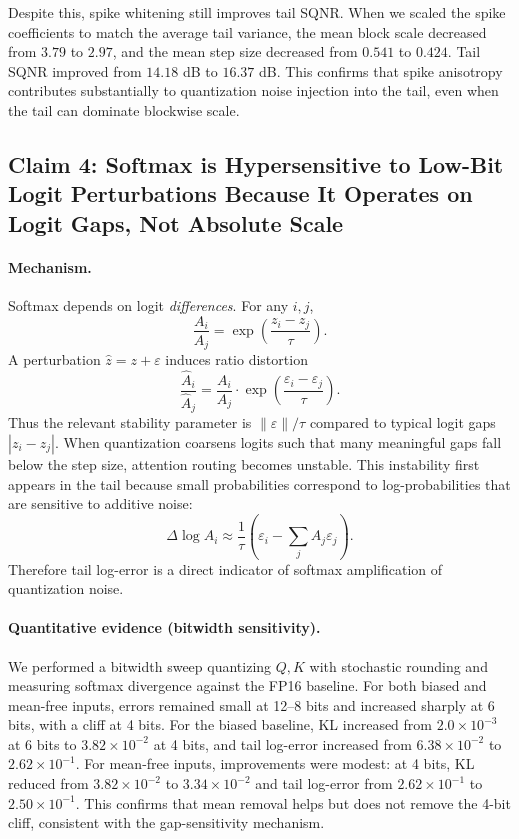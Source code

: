 Despite this, spike whitening still improves tail SQNR. When we scaled the spike coefficients to match the average tail variance, the mean block scale decreased from $3.79$ to $2.97$, and the mean step size decreased from $0.541$ to $0.424$. Tail SQNR improved from $14.18$ dB to $16.37$ dB. This confirms that spike anisotropy contributes substantially to quantization noise injection into the tail, even when the tail can dominate blockwise scale.

\subsection{Claim 4: Softmax is Hypersensitive to Low-Bit Logit Perturbations Because It Operates on Logit Gaps, Not Absolute Scale}

\paragraph{Mechanism.}
Softmax depends on logit \emph{differences}. For any $i,j$,
\[
\frac{A_i}{A_j} = \exp\!\left(\frac{z_i-z_j}{\tau}\right).
\]
A perturbation $\widehat{z} = z + \varepsilon$ induces ratio distortion
\[
\frac{\widehat{A}_i}{\widehat{A}_j} = \frac{A_i}{A_j}\cdot \exp\!\left(\frac{\varepsilon_i-\varepsilon_j}{\tau}\right).
\]
Thus the relevant stability parameter is $\|\varepsilon\|/\tau$ compared to typical logit gaps $|z_i-z_j|$. When quantization coarsens logits such that many meaningful gaps fall below the step size, attention routing becomes unstable. This instability first appears in the tail because small probabilities correspond to log-probabilities that are sensitive to additive noise:
\[
\Delta \log A_i \approx \frac{1}{\tau}\left(\varepsilon_i - \sum_j A_j\varepsilon_j\right).
\]
Therefore tail log-error is a direct indicator of softmax amplification of quantization noise.

\paragraph{Quantitative evidence (bitwidth sensitivity).}
We performed a bitwidth sweep quantizing $Q,K$ with stochastic rounding and measuring softmax divergence against the FP16 baseline. For both biased and mean-free inputs, errors remained small at 12--8 bits and increased sharply at 6 bits, with a cliff at 4 bits. For the biased baseline, KL increased from $2.0\times 10^{-3}$ at 6 bits to $3.82\times 10^{-2}$ at 4 bits, and tail log-error increased from $6.38\times 10^{-2}$ to $2.62\times 10^{-1}$. For mean-free inputs, improvements were modest: at 4 bits, KL reduced from $3.82\times 10^{-2}$ to $3.34\times 10^{-2}$ and tail log-error from $2.62\times 10^{-1}$ to $2.50\times 10^{-1}$. This confirms that mean removal helps but does not remove the 4-bit cliff, consistent with the gap-sensitivity mechanism.

